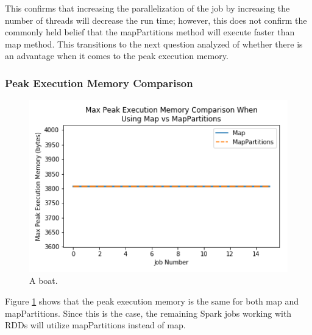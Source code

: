 \documentclass[conference]{IEEEtran}
\begin{document}
This confirms that increasing the parallelization of the job by increasing the number of threads will decrease the run time;
however, this does not confirm the commonly held belief that the mapPartitions method will execute faster than map method.
This transitions to the next question analyzed of whether there is an advantage when it comes to the peak execution memory.

\subsubsection{Peak Execution Memory Comparison}
\begin{figure}
    \includegraphics[width=\linewidth]{../python_scripts/images/mapVsMapPartitionsMaxPeakExecutionMemory.png}
    \caption{A boat.}
    \label{fig:mapVMapPartitionsMaxPeakExecutionMemory}
\end{figure}

Figure \ref{fig:mapVMapPartitionsMaxPeakExecutionMemory} shows that the peak execution memory is the same for both map and mapPartitions.
Since this is the case, the remaining Spark jobs working with RDDs will utilize mapPartitions instead of map.


\end{document}
